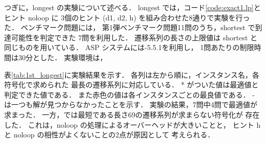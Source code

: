 つぎに，longest の実験について述べる．
longest では，コード\ref{code:exact1.lp}とヒント noloop に
3個のヒント (d1, d2, h) を組み合わせた8通りで実験を行った．
ベンチマーク問題には，%
第1弾ベンチマーク問題11問のうち，shortest で到達可能性を判定できた
7問を利用した．
遷移系列の長さの上限値は shortest と同じものを用いている．
ASP システムには{\clingo}-5.5.1を利用し，
1問あたりの制限時間は30分とした．
実験環境は，

表\ref{tab:1st_longest}に実験結果を示す．
各列は左から順に，インスタンス名，各符号化で求められた
最長の遷移系列に対応している．
* がついた値は最適値と判定できた値である．
また赤色の値は各インスタンスごとの最良値である．
- は一つも解が見つからなかったことを示す．
実験の結果，7問中4問で最適値が求まった．
一方，では最短である長さ69の遷移系列が求まらない符号化が
存在した．
これは，noloop の処理によるオーバーヘッドが大きいことと，
ヒント h と noloop の相性がよくないことの2点が原因として
考えられる．